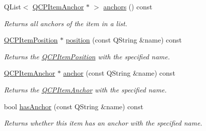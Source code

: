 \begin{DoxyCompactItemize}
Q\+List$<$ \hyperlink{classQCPItemAnchor}{Q\+C\+P\+Item\+Anchor} $\ast$ $>$ \hyperlink{classQCPAbstractItem_a8454b9941960b840608a5a1e00b1977d}{anchors} () const 
\begin{DoxyCompactList}\small\item\em Returns all anchors of the item in a list. \end{DoxyCompactList}\item 
\hyperlink{classQCPItemPosition}{Q\+C\+P\+Item\+Position} $\ast$ \hyperlink{classQCPAbstractItem_af71345bd150f87fa1d2442837b87bb59}{position} (const Q\+String \&name) const 
\begin{DoxyCompactList}\small\item\em Returns the \hyperlink{classQCPItemPosition}{Q\+C\+P\+Item\+Position} with the specified {\itshape name}. \end{DoxyCompactList}\item 
\hyperlink{classQCPItemAnchor}{Q\+C\+P\+Item\+Anchor} $\ast$ \hyperlink{classQCPAbstractItem_abed974cba7cc02608c71dad4638e008d}{anchor} (const Q\+String \&name) const 
\begin{DoxyCompactList}\small\item\em Returns the \hyperlink{classQCPItemAnchor}{Q\+C\+P\+Item\+Anchor} with the specified {\itshape name}. \end{DoxyCompactList}\item 
bool \hyperlink{classQCPAbstractItem_acbce9e5ba5252541d19db0c40303357a}{has\+Anchor} (const Q\+String \&name) const 
\begin{DoxyCompactList}\small\item\em Returns whether this item has an anchor with the specified {\itshape name}. \end{DoxyCompactList}\end{DoxyCompactItemize}
